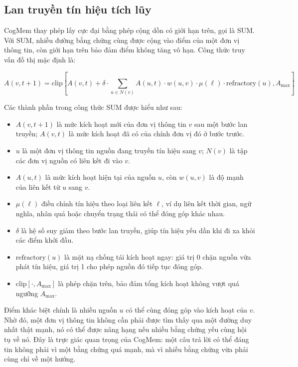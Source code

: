 \documentclass[../main.tex]{subfiles}
\begin{document}
\subsection{Lan truyền tín hiệu tích lũy}

CogMem thay phép lấy cực đại bằng phép cộng dồn có giới hạn trên, gọi là SUM. Với SUM, nhiều đường bằng chứng cùng được cộng vào điểm của một đơn vị thông tin, còn giới hạn trên bảo đảm điểm không tăng vô hạn. Công thức truy vấn đồ thị mặc định là:

\begin{equation}
A(v,t+1) =
\mathrm{clip}
\left[
A(v,t) +
\delta \cdot
\sum_{u \in N(v)}
A(u,t) \cdot w(u,v) \cdot \mu(\ell) \cdot \mathrm{refractory}(u),
A_{\max}
\right]
\end{equation}

Các thành phần trong công thức SUM được hiểu như sau:

\begin{itemize}
    \item $A(v,t+1)$ là mức kích hoạt mới của đơn vị thông tin $v$ sau một bước lan truyền; $A(v,t)$ là mức kích hoạt đã có của chính đơn vị đó ở bước trước.
    \item $u$ là một đơn vị thông tin nguồn đang truyền tín hiệu sang $v$; $N(v)$ là tập các đơn vị nguồn có liên kết đi vào $v$.
    \item $A(u,t)$ là mức kích hoạt hiện tại của nguồn $u$, còn $w(u,v)$ là độ mạnh của liên kết từ $u$ sang $v$.
    \item $\mu(\ell)$ điều chỉnh tín hiệu theo loại liên kết $\ell$, ví dụ liên kết thời gian, ngữ nghĩa, nhân quả hoặc chuyển trạng thái có thể đóng góp khác nhau.
    \item $\delta$ là hệ số suy giảm theo bước lan truyền, giúp tín hiệu yếu dần khi đi xa khỏi các điểm khởi đầu.
    \item $\mathrm{refractory}(u)$ là mặt nạ chống tái kích hoạt ngay: giá trị 0 chặn nguồn vừa phát tín hiệu, giá trị 1 cho phép nguồn đó tiếp tục đóng góp.
    \item $\mathrm{clip}[\cdot, A_{\max}]$ là phép chặn trên, bảo đảm tổng kích hoạt không vượt quá ngưỡng $A_{\max}$.
\end{itemize}

Điểm khác biệt chính là nhiều nguồn $u$ có thể cùng đóng góp vào kích hoạt của $v$. Nhờ đó, một đơn vị thông tin không cần phải được tìm thấy qua một đường duy nhất thật mạnh, nó có thể được nâng hạng nếu nhiều bằng chứng yếu cùng hội tụ về nó. Đây là trực giác quan trọng của CogMem: một câu trả lời có thể đáng tin không phải vì một bằng chứng quá mạnh, mà vì nhiều bằng chứng vừa phải cùng chỉ về một hướng.
\end{document}
